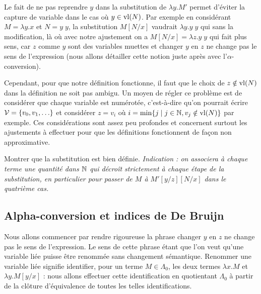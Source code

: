 \begin{rmk}
    Le fait de ne pas reprendre $y$ dans la substitution de $\lambda y.M'$ permet d'éviter la capture de variable dans le cas où $y\in\mathrm{vl}(N)$. Par exemple en considérant $M = \lambda y.x$ et $N = y\;y$, la substitution $M[N/x]$ vaudrait $\lambda y.y\;y$ qui sans la modification, là où avec notre ajustement on a $M[N/x] = \lambda z.y\;y$ qui fait plus sens, car $z$ comme $y$ sont des variables muettes et changer $y$ en $z$ ne change pas le sens de l'expression (nous allons détailler cette notion juste après avec l'$\alpha$-conversion).

    Cependant, pour que notre définition fonctionne, il faut que le choix de $z\notin\mathrm{vl}(N)$ dans la définition ne soit pas ambigu. Un moyen de régler ce problème est de considérer que chaque variable est numérotée, c'est-à-dire qu'on pourrait écrire $\mathcal V = \{v_0,v_1,\ldots\}$ et considérer $z = v_i$ où $i = \min \{j\mid j\in\mathbb{N}, v_j\notin\mathrm{vl}(N)\}$ par exemple. Ces considérations sont assez peu profondes et concernent surtout les ajustements à effectuer pour que les définitions fonctionnent de façon non approximative.
\end{rmk}

\begin{exo}
    Montrer que la substitution est bien définie. \textit{Indication : on associera à chaque terme une quantité dans $\mathbb{N}$ qui décroît strictement à chaque étape de la substitution, en particulier pour passer de $M$ à $M'[y/z][N/x]$ dans le quatrième cas.}
\end{exo}

\subsection{Alpha-conversion et indices de De Bruijn}

Nous allons commencer par rendre rigoureuse la phrase \og changer $y$ en $z$ ne change pas le sens de l'expression\fg{}. Le sens de cette phrase étant que l'on veut qu'une variable liée puisse être renommée sans changement sémantique. Renommer une variable liée signifie identifier, pour un terme $M\in\Lambda_0$, les deux termes $\lambda x.M$ et $\lambda y.M[y/x]$ : nous allons effectuer cette identification en quotientant $\Lambda_0$ à partir de la clôture d'équivalence de toutes les telles identifications.

